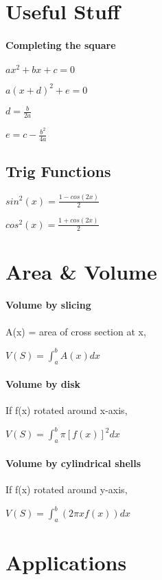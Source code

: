\documentclass[10pt,landscape]{article}
\begin{document}
	
	\raggedright
	\footnotesize
	\begin{multicols}{4}
\section{Useful Stuff}

\paragraph{Completing the square}

$ax^2 + bx + c = 0$

$a(x+d)^2 + e = 0$

$d = \frac{b}{2a}$

$e = c - \frac{b^2}{4a}$

\subsection{Trig Functions}

$sin^2(x) = \frac{1-cos(2x)}{2}$

$cos^2(x) = \frac{1+cos(2x)}{2}$


\section{Area \& Volume}

\paragraph{Volume by slicing}

A(x) = area of cross section at x,

$V(S) = \int_{a}^{b}A(x)dx$

\paragraph{Volume by disk}

If f(x) rotated around x-axis,

$V(S) = \int_{a}^{b}\pi [f(x)]^2dx$

\paragraph{Volume by cylindrical shells}

If f(x) rotated around y-axis,

$V(S) = \int_{a}^{b}(2\pi x f(x))dx$

\section{Applications}


\end{multicols}
\end{document}
